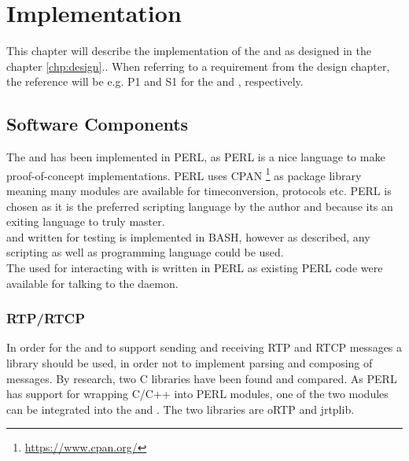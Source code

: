 \chapter{Implementation} \label{chp:implementation}
This chapter will describe the implementation of the \pub{} and \sub{} as designed in the chapter \ref{chp:design}.. When referring to a requirement from the design chapter, the reference will be e.g. P1 and S1 for the \pub{} and \sub{}, respectively.

\section{Software Components}
The \pub{} and \sub{} has been implemented in PERL, as PERL is a nice language to make proof-of-concept implementations. PERL uses CPAN \footnote{\url{https://www.cpan.org/}} as package library meaning many modules are available for timeconversion, protocols etc. PERL is chosen as it is the preferred scripting language by the author and because its an exiting language to truly master.\\

\noindent{}\pro{} and \cons{} written for testing is implemented in BASH, however as described, any scripting as well as programming language could be used.\\

\noindent{} The \pro{} used for interacting with  is written in PERL as existing PERL code were available for talking to the  daemon.

\subsection{RTP/RTCP}
In order for the \pub{} and \sub{} to support sending and receiving RTP and RTCP messages a library should be used, in order not to implement parsing and composing of messages. By research, two C libraries have been found and compared. As PERL has support for wrapping C/C++ into PERL modules, one of the two modules can be integrated into the \subs{} and \pubs{}. The two libraries are oRTP and jrtplib.\\

